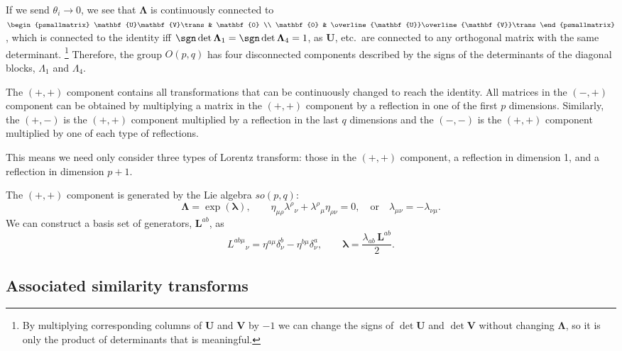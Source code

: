 \documentclass[11pt]{article}
\newcommand{\U}{\mathbf{U}}
\newcommand{\V}{\mathbf{V}}
\newcommand{\Ub}{\overline{\U}}
\newcommand{\Vb}{\overline{\V}}
\newcommand{\lambdab}{\boldsymbol{\lambda}}
\newcommand{\Lambdab}{\boldsymbol{\Lambda}}
\begin{document}
If we send \(\theta_i \to 0\), we see that \(\Lambdab\) is continuously connected to
\(
\begin{psmallmatrix}
  \U\V\trans & \mathbf{0} \\
  \mathbf{0} & \Ub\Vb\trans
\end{psmallmatrix}
\),
which is connected to the identity iff \(\sgn \det \Lambdab_1 = \sgn \det \Lambdab_4 = 1\), 
as \(\U\), etc.\ are connected to any orthogonal matrix with the same determinant.%
\footnote{By multiplying corresponding columns of \(\U\) and \(\V\) by \(-1\) we can change the signs of \(\det\U\) and \(\det\V\) without changing \(\Lambdab\), so it is only the product of determinants that is meaningful.}
Therefore, the group \(O(p,q)\) has four disconnected components described by the signs of the determinants of the diagonal blocks, \(\Lambda_1\) and  \(\Lambda_4\).

The \((+,+)\) component contains all transformations that can be continuously changed to reach the identity.
All matrices in the \((-,+)\) component can be obtained by multiplying a matrix in the \((+,+)\) component by a reflection in one of the first \(p\) dimensions.
Similarly, the \((+,-)\) is the \((+,+)\) component multiplied by a reflection in the last \(q\) dimensions and the \((-,-)\) is the \((+,+)\) component multiplied by one of each type of reflections.

This means we need only consider three types of Lorentz transform: those in the \((+,+)\) component, a reflection in dimension 1, and a reflection in dimension \(p+1\).

The \((+,+)\) component is generated by the Lie algebra \(so(p,q)\):
%
\begin{equation}\label{eq:lielorentz}
  \Lambdab = \exp(\lambdab),
  \qquad
  \eta_{\mu\rho} \lambda^\rho{}_\nu +  \lambda^\rho{}_\mu \eta_{\rho\nu} = 0,
  \quad \text{or} \quad
  \lambda_{\mu\nu} = - \lambda_{\nu\mu}.
\end{equation}
%
We can construct a basis set of generators, \(\mathbf{L}^{ab}\), as
%
\begin{equation}\label{eq:genlorentz}
  L^{ab\mu}{}_\nu = \eta^{a\mu} \delta^b_\nu - \eta^{b\mu} \delta_\nu^a,
  \qquad
  \lambdab = \frac{\lambda_{ab}\, \mathbf{L}^{ab}}{2}.
\end{equation}
%



\subsection{Associated similarity transforms}\label{sec:simlorentz}
\end{document}
